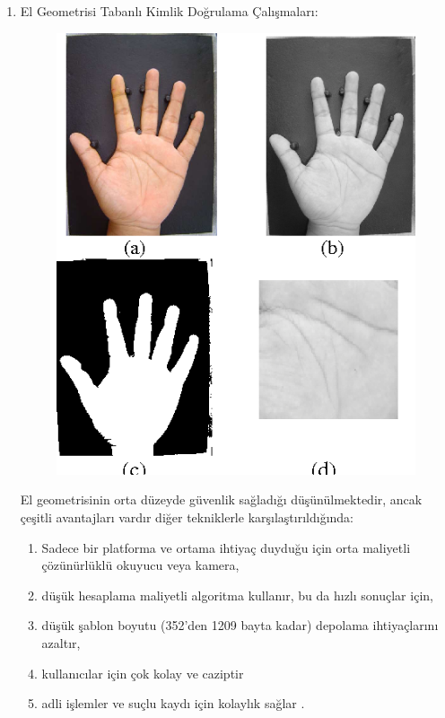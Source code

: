 \documentclass[12pt, a4paper]{article}
\begin{document}
\begin{enumerate}
	
	\item El Geometrisi Tabanlı Kimlik Doğrulama Çalışmaları:
			\begin{figure}[!h]
		\centering
		\includegraphics{hand2.png}
	\end{figure}
		
	El geometrisinin orta düzeyde güvenlik sağladığı düşünülmektedir, ancak çeşitli avantajları vardır
	diğer tekniklerle karşılaştırıldığında:
	\begin{enumerate}
		\item  Sadece bir platforma ve ortama ihtiyaç duyduğu için orta maliyetli
		çözünürlüklü okuyucu veya kamera,
		\item  düşük hesaplama maliyetli algoritma kullanır, bu da
		hızlı sonuçlar için,
		\item  düşük şablon boyutu (352'den 1209 bayta kadar)
		depolama ihtiyaçlarını azaltır,
		\item  kullanıcılar için çok kolay ve caziptir 
		
		\item  adli işlemler ve suçlu kaydı için kolaylık sağlar \cite{varchol2007using}.


\end{enumerate}
\end{enumerate}
\end{document}
